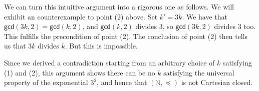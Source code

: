 We can turn this intuitive argument into a rigorous one as follows.
We will exhibit an counterexample to point (2) above. Set \(k' = 3k\).
We have that \(\mathsf{gcd}(3k,2) = \mathsf{gcd}(k,2)\), and \(\mathsf{gcd}(k,2)\) divides \(3\),
so \(\mathsf{gcd}(3k,2)\) divides \(3\) too. This fulfills the precondition of point (2).
The conclusion of point (2) then tells us that
\(3k\) divides \(k\). But this is impossible.

Since we derived a contradiction starting from an arbitrary choice of \(k\) satisfying (1) and (2),
this argument shows
there can be no \(k\) satisfying the universal property of the exponential \(3^2\),
and hence that
$(\mathbb{N}, \preceq)$ is not Cartesian closed.



